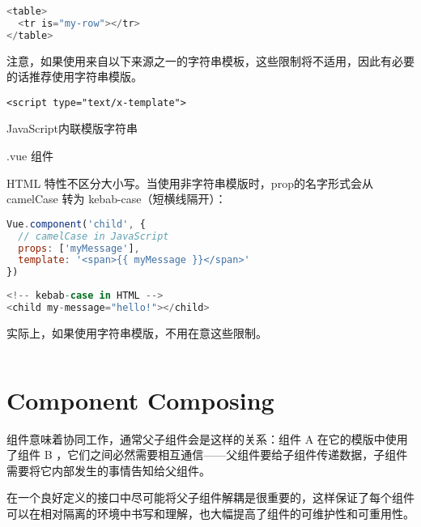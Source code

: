 \begin{lstlisting}[language=JavaScript]
<table>
  <tr is="my-row"></tr>
</table>
\end{lstlisting}

注意，如果使用来自以下来源之一的字符串模板，这些限制将不适用，因此有必要的话推荐使用字符串模版。

\begin{compactitem}
\item \texttt{<script type="text/x-template">}
\item JavaScript内联模版字符串
\item .vue 组件
\end{compactitem}

HTML 特性不区分大小写。当使用非字符串模版时，prop的名字形式会从 camelCase 转为 kebab-case（短横线隔开）：



\begin{lstlisting}[language=JavaScript]
Vue.component('child', {
  // camelCase in JavaScript
  props: ['myMessage'],
  template: '<span>{{ myMessage }}</span>'
})
\end{lstlisting}



\begin{lstlisting}[language=JavaScript]
<!-- kebab-case in HTML -->
<child my-message="hello!"></child>
\end{lstlisting}

实际上，如果使用字符串模版，不用在意这些限制。

\begin{lstlisting}[language=JavaScript]

\end{lstlisting}






\section{Component Composing}

组件意味着协同工作，通常父子组件会是这样的关系：组件 A 在它的模版中使用了组件 B ，它们之间必然需要相互通信——父组件要给子组件传递数据，子组件需要将它内部发生的事情告知给父组件。

在一个良好定义的接口中尽可能将父子组件解耦是很重要的，这样保证了每个组件可以在相对隔离的环境中书写和理解，也大幅提高了组件的可维护性和可重用性。



\begin{lstlisting}[language=JavaScript]

\end{lstlisting}




